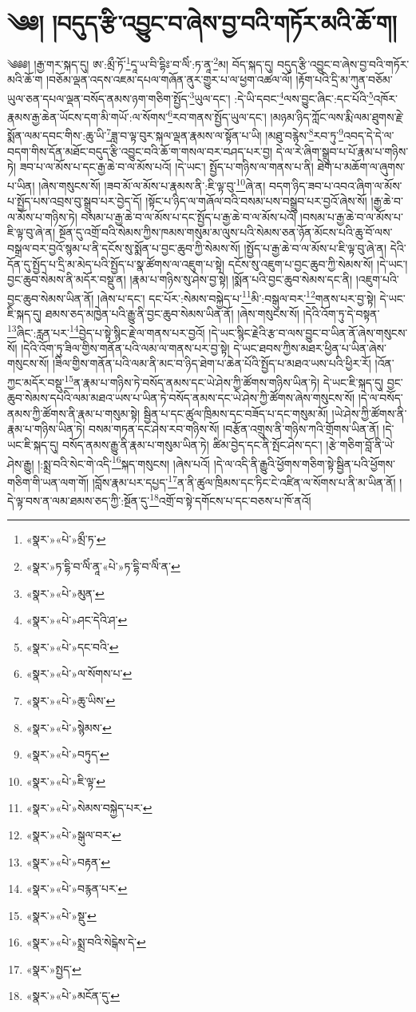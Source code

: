\chapter{༄༅། །བདུད་རྩི་འབྱུང་བ་ཞེས་བྱ་བའི་གཏོར་མའི་ཆོ་ག།}༄༅༅། །རྒྱ་གར་སྐད་དུ། ཨ་:མྲྀ་ཏོ་\footnote{«སྣར་»«པེ་»མྲྀ་ཏ་}དཱ་ཡ་བི་དྷིཿ་བ་ལིཾ་:ཏ་ནཱ་\footnote{«སྣར་»ཏ་དྷི་བ་ལིཾ་ནཱ་«པེ་»ཏ་དྷི་བ་ལིཾ་ན་}མ། བོད་སྐད་དུ། བདུད་རྩི་འབྱུང་བ་ཞེས་བྱ་བའི་གཏོར་མའི་ཆོ་ག །བཅོམ་ལྡན་འདས་འཇམ་དཔལ་གཞོན་ནུར་གྱུར་པ་ལ་ཕྱག་འཚལ་ལོ། །རྟོག་པའི་དྲི་མ་ཀུན་བཅོམ་ཡུལ་ཅན་དཔལ་ལྡན་བསོད་ནམས་ཉག་གཅིག་སྤྱོད་\footnote{«སྣར་»«པེ་»མུན་}ཡུལ་དང་། :དེ་ཡི་དབང་\footnote{«སྣར་»«པེ་»ཤང་དེའི་ཤ་}ལས་བྱུང་ཞིང་:དང་པོའི་\footnote{«སྣར་»«པེ་»དང་བའི་}འཁོར་རྣམས་རྒྱ་ཆེན་ཡོངས་དག་མི་གཡོ་:ལ་སོགས་\footnote{«སྣར་»«པེ་»ལ་སོགས་པ་}རབ་གནས་སྤྱོད་ཡུལ་དང་། །མཉམ་ཉིད་ཀློང་ལས་རྨི་ལམ་ཐུགས་རྗེ་སྨོན་ལམ་དབང་གིས་:ཆུ་ཡི་\footnote{«སྣར་»«པེ་»ཆུ་ཡིས་}ཟླ་བ་ལྟ་བུར་སྐལ་ལྡན་རྣམས་ལ་སྟོན་པ་ཡི། །མཐུ་བརྙེས་\footnote{«སྣར་»«པེ་»སྙེམས་}རབ་ཏུ་\footnote{«སྣར་»«པེ་»བཏུད་}འབད་དེ་དེ་ལ་བདག་གིས་དོན་མཐོང་བདུད་རྩི་འབྱུང་བའི་ཆོ་ག་གསལ་བར་བཤད་པར་བྱ། དེ་ལ་རེ་ཞིག་སྒྲུབ་པ་པོ་རྣམ་པ་གཉིས་ཏེ། ཟབ་པ་ལ་མོས་པ་དང་རྒྱ་ཆེ་བ་ལ་མོས་པའོ། །དེ་ཡང་། སྤྱོད་པ་གཉིས་ལ་གནས་པ་ནི། ཐེག་པ་མཆོག་ལ་ཞུགས་པ་ཡིན། །ཞེས་གསུངས་སོ། །ཟབ་མོ་ལ་མོས་པ་རྣམས་ནི་:ཇི་ལྟ་བུ་\footnote{«སྣར་»«པེ་»ཇི་ལྟ་}ཞེ་ན། བདག་ཉིད་ཟབ་པ་འབའ་ཞིག་ལ་མོས་པ་སྤྱོད་པས་འབྲས་བུ་སྒྲུབ་པར་བྱེད་དོ། །སྟོང་པ་ཉིད་ལ་གཞོལ་བའི་བསམ་པས་བསྒྲུབ་པར་བྱའོ་ཞེས་སོ། །རྒྱ་ཆེ་བ་ལ་མོས་པ་གཉིས་ཏེ། བསམ་པ་རྒྱ་ཆེ་བ་ལ་མོས་པ་དང་སྤྱོད་པ་རྒྱ་ཆེ་བ་ལ་མོས་པའོ། །བསམ་པ་རྒྱ་ཆེ་བ་ལ་མོས་པ་ཇི་ལྟ་བུ་ཞེ་ན། སྔོན་དུ་འགྲོ་བའི་སེམས་ཀྱིས་ཁམས་གསུམ་མ་ལུས་པའི་སེམས་ཅན་ཉོན་མོངས་པའི་ཆུ་བོ་ལས་བསྒྲལ་བར་བྱའོ་སྙམ་པ་ནི་དངོས་སུ་སྨོན་པ་བྱང་ཆུབ་ཀྱི་སེམས་སོ། །སྤྱོད་པ་རྒྱ་ཆེ་བ་ལ་མོས་པ་ཇི་ལྟ་བུ་ཞེ་ན། དེའི་དོན་དུ་སྤྱོད་པ་དྲི་མ་མེད་པའི་སྤྱོད་པ་སྣ་ཚོགས་ལ་འཇུག་པ་སྟེ། དངོས་སུ་འཇུག་པ་བྱང་ཆུབ་ཀྱི་སེམས་སོ། །དེ་ཡང་། བྱང་ཆུབ་སེམས་ནི་མདོར་བསྡུ་ན། །རྣམ་པ་གཉིས་སུ་ཤེས་བྱ་སྟེ། །སྨོན་པའི་བྱང་ཆུབ་སེམས་དང་ནི། །འཇུག་པའི་བྱང་ཆུབ་སེམས་ཡིན་ནོ། །ཞེས་པ་དང་། དང་པོར་:སེམས་བསྐྱེད་པ་\footnote{«སྣར་»«པེ་»སེམས་བསྐྱེད་པར་}མི་:བསྒུལ་བར་\footnote{«སྣར་»«པེ་»སྒུལ་བར་}གནས་པར་བྱ་སྟེ། དེ་ཡང་ཇི་སྐད་དུ། ཐམས་ཅད་མཁྱེན་པའི་རྒྱུ་ནི་བྱང་ཆུབ་སེམས་ཡིན་ནོ། །ཞེས་གསུངས་སོ། །དེའི་འོག་ཏུ་དེ་བསྟན་\footnote{«སྣར་»«པེ་»བརྟན་}ཞིང་:རླན་པར་\footnote{«སྣར་»«པེ་»བརྙན་པར་}བྱེད་པ་སྟེ་སྙིང་རྗེ་ལ་གནས་པར་བྱའོ། །དེ་ཡང་སྙིང་རྗེའི་རྩ་བ་ལས་བྱུང་བ་ཡིན་ནོ་ཞེས་གསུངས་སོ། །དེའི་འོག་ཏུ་ཟིལ་གྱིས་གནོན་པའི་ལམ་ལ་གནས་པར་བྱ་སྟེ། དེ་ཡང་ཐབས་ཀྱིས་མཐར་ཕྱིན་པ་ཡིན་ཞེས་གསུངས་སོ། །ཟིལ་གྱིས་གནོན་པའི་ལམ་ནི་མང་བ་ཉིད་ཐེག་པ་ཆེན་པོའི་སྤྱོད་པ་མཐའ་ཡས་པའི་ཕྱིར་རོ། །འོན་ཀྱང་མདོར་བསྡུ་\footnote{«སྣར་»«པེ་»སྡུ་}ན་རྣམ་པ་གཉིས་ཏེ་བསོད་ནམས་དང་ཡེ་ཤེས་ཀྱི་ཚོགས་གཉིས་ཡིན་ཏེ། དེ་ཡང་ཇི་སྐད་དུ། བྱང་ཆུབ་སེམས་དཔའི་ལམ་མཐའ་ཡས་པ་ཡིན་ཏེ་བསོད་ནམས་དང་ཡེ་ཤེས་ཀྱི་ཚོགས་ཞེས་གསུངས་སོ། །དེ་ལ་བསོད་ནམས་ཀྱི་ཚོགས་ནི་རྣམ་པ་གསུམ་སྟེ། སྦྱིན་པ་དང་ཚུལ་ཁྲིམས་དང་བཟོད་པ་དང་གསུམ་མོ། །ཡེ་ཤེས་ཀྱི་ཚོགས་ནི་རྣམ་པ་གཉིས་ཡིན་ཏེ། བསམ་གཏན་དང་ཤེས་རབ་གཉིས་སོ། །བརྩོན་འགྲུས་ནི་གཉིས་ཀའི་གྲོགས་ཡིན་ནོ། །དེ་ཡང་ཇི་སྐད་དུ། བསོད་ནམས་རྒྱུ་ནི་རྣམ་པ་གསུམ་ཡིན་ཏེ། ཚིམ་བྱེད་དང་ནི་སྤོང་ཤེས་དང་། །རྩེ་གཅིག་བློ་ནི་ཡེ་ཤེས་རྒྱུ། །:སྨྲ་བའི་སེང་གེ་འདི་\footnote{«སྣར་»«པེ་»སྨྲ་བའི་སེངྒེས་དེ་}སྐད་གསུངས། །ཞེས་པའོ། །དེ་ལ་འདི་ནི་རྒྱུའི་ཕྱོགས་གཅིག་སྟེ་སྦྱིན་པའི་ཕྱོགས་གཅིག་གི་ཡན་ལག་གོ། །བློས་རྣམ་པར་དཔྱད་\footnote{«སྣར་»སྤྱད་}ན་ནི་ཚུལ་ཁྲིམས་དང་ཏིང་ངེ་འཛིན་ལ་སོགས་པ་ནི་མ་ཡིན་ནོ། །དེ་ལྟ་བས་ན་ལམ་ཐམས་ཅད་ཀྱི་:སྔོན་དུ་\footnote{«སྣར་»«པེ་»མངོན་དུ་}འགྲོ་བ་སྟེ་དགོངས་པ་དང་བཅས་པ་ཁོ་ནའོ། 